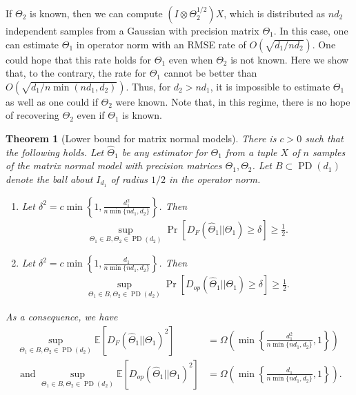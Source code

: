 \documentclass[aos]{imsart}
\newtheorem{theorem}{Theorem}[section]
\theoremstyle{definition}
\numberwithin{equation}{section}
\DeclareMathOperator{\PD}{PD}
\newcommand{\htheta}{\widehat{\Theta}}
\newcommand{\ot}{\otimes}
\newcommand{\E}{\mathbb{E}}
\begin{document}
If $\Theta_2$ is known, then we can compute $(I \ot \Theta_2^{1/2} )X$, which is distributed as $nd_2$ independent samples from a Gaussian with precision matrix $\Theta_1$. In this case, one can estimate $\Theta_1$ in operator norm with an RMSE rate of $O(\sqrt{ d_1/ n d_2})$. One could hope that this rate holds for $\Theta_1$ even when $\Theta_2$ is not known. Here we show that, to the contrary, the rate for $\Theta_1$ cannot be better than $O(\sqrt{d_1/ n \min(n d_1, d_2)})$. Thus, for $d_2 > n d_1$, it is impossible to estimate $\Theta_1$ as well as one could if $\Theta_2$ were known. Note that, in this regime, there is no hope of recovering $\Theta_2$ even if $\Theta_1$ is known.


\begin{theorem}[Lower bound for matrix normal models]\label{thm:matrix-lower}
There is $c > 0$ such that the following holds. Let $\htheta_1$ be any estimator for $\Theta_1$ from a tuple $X$ of $n$ samples of the matrix normal model with precision matrices $\Theta_1, \Theta_2$. Let $B\subset \PD(d_1)$ denote the ball about $I_{d_1}$ of radius $1/2$ in the operator norm.
\begin{enumerate}
\item \label{it:frob-lower} Let $\delta^2 = c\min \left\{1,\frac{d_1^2}{n \min \{n d_1, d_2\}}\right\}$. Then
\begin{align}
\sup_{\Theta_1 \in B, \Theta_2 \in \PD(d_2)} \Pr\left[ D_F(\htheta_1|| \Theta_1)  \geq \delta\right] \geq \frac{1}{2}.
\end{align}
\item\label{it:op-lower} Let $\delta^2 = c\min \left\{1,\frac{d_1}{n \min \{n d_1, d_2\}}\right\}$. Then
 \begin{align}
\sup_{\Theta_1 \in B, \Theta_2 \in \PD(d_2)} \Pr\left[ D_{op}(\htheta_1|| \Theta_1) \geq \delta\right] \geq \frac{1}{2}. \label{eq:dop-lower-matrix-normal}
\end{align}
\end{enumerate}
As a consequence, we have 
\begin{align*}\sup_{\Theta_1 \in B, \Theta_2 \in \PD(d_2)}\E[D_F(\htheta_1|| \Theta_1)^2] &=\Omega\left( \min \left\{\frac{d_1^2}{n \min \{n d_1, d_2\}},1\right\}\right)\\
\text{ and } \sup_{\Theta_1 \in B, \Theta_2 \in \PD(d_2)}\E[D_{op}(\htheta_1|| \Theta_1)^2] &= \Omega\left( \min \left\{\frac{d_1}{n \min \{n d_1, d_2\}},1\right\}\right).\end{align*}
\end{theorem}
\end{document}
